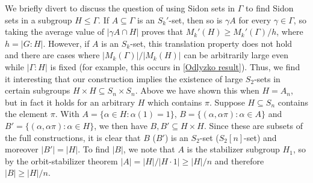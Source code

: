 \documentclass[12pt]{article}
\begin{document}
We briefly divert to discuss the question of using Sidon sets in $\Gamma$ to find Sidon sets in a subgroup $H\le\Gamma$. If $A\subseteq\Gamma$ is an $S_k'$-set, then so is $\gamma A$ for every $\gamma\in\Gamma$, so taking the average value of $|\gamma A\cap H|$ proves that $M_k'(H)\ge M_k'(\Gamma)/h$, where $h=|G:H|$. However, if $A$ is an $S_k$-set, this translation property does not hold and there are cases where $|M_k(\Gamma)|/|M_k(H)|$ can be arbitrarily large even while $|\Gamma:H|$ is fixed (for example, this occurs in \autoref{Odlyzko result}). Thus, we find it interesting that our construction implies the existence of large $S_2$-sets in certain subgroups $H\times H\subseteq S_n\times S_n$. Above we have shown this when $H=A_n$, but in fact it holds for an arbitrary $H$ which contains $\pi$. Suppose $H\subseteq S_n$ contains the element $\pi$. With $A=\{\alpha\in H:\alpha(1)=1\}$, $B=\{(\alpha,\alpha\pi):\alpha\in A\}$ and $B'=\{(\alpha,\alpha\pi):\alpha\in H\}$, we then have $B,B'\subseteq H\times H$. Since these are subsets of the full constructions, it is clear that $B$ ($B'$) is an $S_2$-set ($S_2[n]$-set) and moreover $|B'|=|H|.$ To find $|B|$, we note that $A$ is the stabilizer subgroup $H_1$, so by the orbit-stabilizer theorem $|A|=|H|/|H\cdot 1|\ge |H|/n$ and therefore $|B|\ge |H|/n$.
\end{document}

